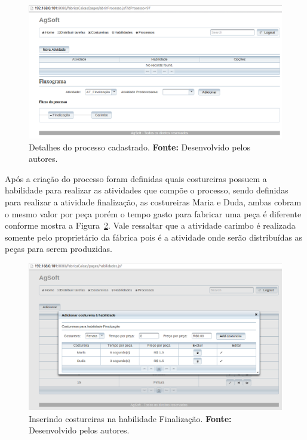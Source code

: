 \begin{figure}[h!]
	\centerline{\includegraphics[scale=0.3]{./imagens/tela_processo_teste1.png}}
	\caption[Detalhes do processo cadastrado.]
	{Detalhes do processo cadastrado. \textbf{Fonte:} Desenvolvido pelos autores.}
	\label{fig:processo_cadastrado}
\end{figure}

\par Após a criação do processo foram definidas quais costureiras possuem a
habilidade para realizar as atividades que compõe o processo, sendo definidas para 
realizar a atividade finalização, as costureiras Maria e Duda, ambas cobram o 
mesmo valor por peça porém o tempo gasto para fabricar uma peça é diferente 
conforme mostra a Figura~\ref{fig:costureira_habilidade}. Vale ressaltar que
a atividade carimbo é realizada somente pelo proprietário da fábrica pois é a
atividade onde serão distribuídas as peças para serem produzidas. 


\begin{figure}[h!]
	\centerline{\includegraphics[scale=0.4]{./imagens/tela_habilidade_teste1.png}}
	\caption[Inserindo costureiras na habilidade Finalização.]
	{Inserindo costureiras na habilidade Finalização. \textbf{Fonte:} Desenvolvido
	pelos autores.}
	\label{fig:costureira_habilidade}
\end{figure}


